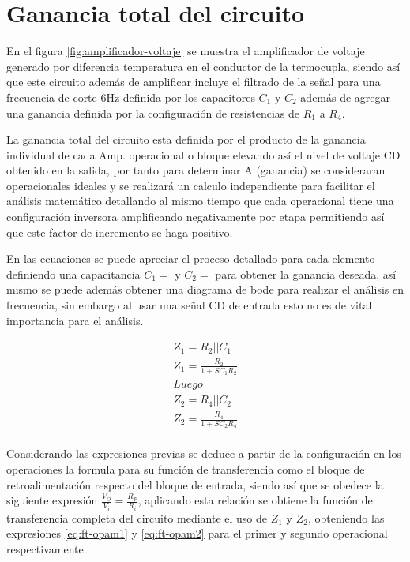 \section*{Ganancia total del circuito}

En el figura \ref{fig:amplificador-voltaje} se muestra el amplificador de voltaje generado por diferencia temperatura en el conductor de la termocupla, siendo así que este circuito además de amplificar incluye el filtrado de la señal para una frecuencia de corte 6Hz definida por los capacitores $C_1$ y $C_2$ además de agregar una ganancia definida por la configuración de resistencias de $R_1$ a $R_4$.

La ganancia total del circuito esta definida por el producto de la ganancia individual de cada Amp. operacional o bloque elevando así el nivel de voltaje CD obtenido en la salida, por tanto para determinar A (ganancia) se consideraran operacionales ideales y se realizará un calculo independiente para facilitar el análisis matemático detallando al mismo tiempo que cada operacional tiene una configuración inversora amplificando negativamente por etapa permitiendo así que este factor de incremento se haga positivo.

En las ecuaciones se puede apreciar el proceso detallado para cada elemento definiendo una capacitancia $C_1 = $ y $C_2 = $ para obtener la ganancia deseada, así mismo se puede además obtener una diagrama de bode para realizar el análisis en frecuencia, sin embargo al usar una señal CD de entrada esto no es de vital importancia para el análisis.

\begin{align*}
	Z_1 = R_2 || C_1\\
	Z_1 = \frac{R_2}{1 + SC_1R_2}\\
	Luego \\
	Z_2 = R_4 || C_2\\
	Z_2 = \frac{R_4}{1 + SC_2R_4}\\
\end{align*}

Considerando las expresiones previas se deduce a partir de la configuración en los operaciones la formula para su función de transferencia como el bloque de retroalimentación respecto del bloque de entrada, siendo así que se obedece la siguiente expresión $\frac{V_O}{V_i} = \frac{R_F}{R_i} $, aplicando esta relación se obtiene la función de transferencia completa del circuito mediante el uso de $Z_1$ y $Z_2$, obteniendo las expresiones \ref{eq:ft-opam1} y \ref{eq:ft-opam2} para el primer y segundo operacional respectivamente.

